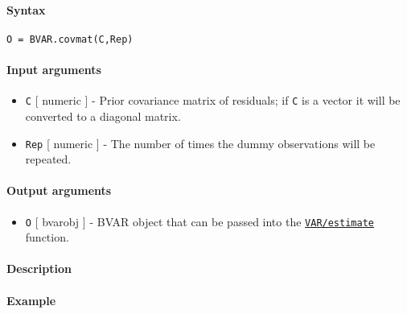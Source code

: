 


	\paragraph{Syntax}\label{syntax}

\begin{verbatim}
O = BVAR.covmat(C,Rep)
\end{verbatim}

\paragraph{Input arguments}\label{input-arguments}

\begin{itemize}
\item
  \texttt{C} {[} numeric {]} - Prior covariance matrix of residuals; if
  \texttt{C} is a vector it will be converted to a diagonal matrix.
\item
  \texttt{Rep} {[} numeric {]} - The number of times the dummy
  observations will be repeated.
\end{itemize}

\paragraph{Output arguments}\label{output-arguments}

\begin{itemize}
\itemsep1pt\parskip0pt
\item
  \texttt{O} {[} bvarobj {]} - BVAR object that can be passed into the
  \href{VAR/estimate}{\texttt{VAR/estimate}} function.
\end{itemize}

\paragraph{Description}\label{description}

\paragraph{Example}\label{example}


